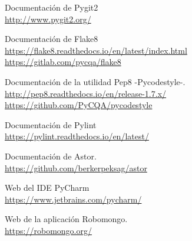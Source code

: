 \begin{thebibliography}{25}
Documentación de Pygit2   \\
{\footnotesize
\url{http://www.pygit2.org/}} 

Documentación de Flake8   \\
{\footnotesize
\url{https://flake8.readthedocs.io/en/latest/index.html}\\ \url{https://gitlab.com/pycqa/flake8}} 

Documentación de la utilidad Pep8 -Pycodestyle-.  \\
{\footnotesize
\url{http://pep8.readthedocs.io/en/release-1.7.x/}\\
\url{https://github.com/PyCQA/pycodestyle}} 

Documentación de Pylint   \\
{\footnotesize
\url{https://pylint.readthedocs.io/en/latest/}} 

Documentación de Astor.   \\
{\footnotesize
\url{https://github.com/berkerpeksag/astor}} 

Web del IDE PyCharm   \\
{\footnotesize
\url{https://www.jetbrains.com/pycharm/}} 

Web de la aplicación Robomongo.   \\
{\footnotesize
\url{https://robomongo.org/}}

\end{thebibliography}